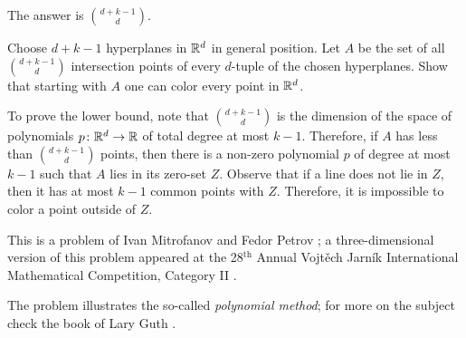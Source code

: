The answer is $\binom{d+k-1}{d}$.

Choose $d+k-1$ hyperplanes in $\mathbb{R}^d$ in general position.
Let $A$ be the set of all $\binom{d+k-1}{d}$ intersection points of every $d$-tuple of the chosen hyperplanes. 
Show that starting with $A$ one can color every point in $\mathbb{R}^d$.

To prove the lower bound, note that $\binom{d+k-1}{d}$ is the dimension of the space of polynomials $p\colon\mathbb{R}^d\to\mathbb{R}$ of total degree at most $k-1$.
Therefore, if $A$ has less than $\binom{d+k-1}{d}$ points, then there is a non-zero polynomial $p$ of degree at most $k-1$ such that $A$ lies in its zero-set $Z$.
Observe that if a line does not lie in $Z$, then it has at most $k-1$ common points with $Z$.
Therefore, it is impossible to color a point outside of $Z$.
\qeds

This is a problem of Ivan Mitrofanov and Fedor Petrov \cite[№ 10]{kanel-belov};
a three-dimensional version of this problem appeared at the 28$^\text{th}$ Annual Vojtěch Jarník International Mathematical Competition, Category II \cite{vjimc}.

The problem illustrates the so-called \emph{polynomial method};
for more on the subject check the book of Lary Guth \cite{guth2016}. 


